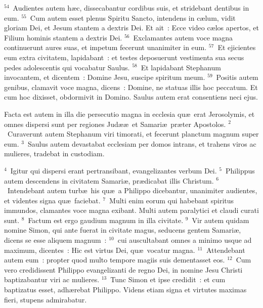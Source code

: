 ${}^{54}$~Audientes autem h\ae c, dissecabantur cordibus suis, et stridebant dentibus in eum.
${}^{55}$~Cum autem esset plenus Spiritu Sancto, intendens in c\ae lum, vidit gloriam Dei, et Jesum stantem a dextris Dei. Et ait~: Ecce video c\ae los apertos, et Filium hominis stantem a dextris Dei.
${}^{56}$~Exclamantes autem voce magna continuerunt aures suas, et impetum fecerunt unanimiter in eum.
${}^{57}$~Et ejicientes eum extra civitatem, lapidabant~: et testes deposuerunt vestimenta sua secus pedes adolescentis qui vocabatur Saulus.
${}^{58}$~Et lapidabant Stephanum invocantem, et dicentem~: Domine Jesu, suscipe spiritum meum.
${}^{59}$~Positis autem genibus, clamavit voce magna, dicens~: Domine, ne statuas illis hoc peccatum. Et cum hoc dixisset, obdormivit in Domino. Saulus autem erat consentiens neci ejus.

\lettrine[lines=3,image=true,loversize=0.05,lraise=-0.03]{F}{}acta est autem in illa die persecutio magna in ecclesia qu\ae\ erat Jerosolymis, et omnes dispersi sunt per regiones Jud\ae \ae\ et Samari\ae\ pr\ae ter Apostolos.
${}^{2}$~Curaverunt autem Stephanum viri timorati, et fecerunt planctum magnum super eum.
${}^{3}$~Saulus autem devastabat ecclesiam per domos intrans, et trahens viros ac mulieres, tradebat in custodiam.


${}^{4}$~Igitur qui dispersi erant pertransibant, evangelizantes verbum Dei.
${}^{5}$~Philippus autem descendens in civitatem Samari\ae , pr\ae dicabat illis Christum.
${}^{6}$~Intendebant autem turb\ae\ his qu\ae\ a Philippo dicebantur, unanimiter audientes, et videntes signa qu\ae\ faciebat.
${}^{7}$~Multi enim eorum qui habebant spiritus immundos, clamantes voce magna exibant. Multi autem paralytici et claudi curati sunt.
${}^{8}$~Factum est ergo gaudium magnum in illa civitate.
${}^{9}$~Vir autem quidam nomine Simon, qui ante fuerat in civitate magus, seducens gentem Samari\ae , dicens se esse aliquem magnum~:
${}^{10}$~cui auscultabant omnes a minimo usque ad maximum, dicentes~: Hic est virtus Dei, qu\ae\ vocatur magna.
${}^{11}$~Attendebant autem eum~: propter quod multo tempore magiis suis dementasset eos.
${}^{12}$~Cum vero credidissent Philippo evangelizanti de regno Dei, in nomine Jesu Christi baptizabantur viri ac mulieres.
${}^{13}$~Tunc Simon et ipse credidit~: et cum baptizatus esset, adh\ae rebat Philippo. Videns etiam signa et virtutes maximas fieri, stupens admirabatur.


